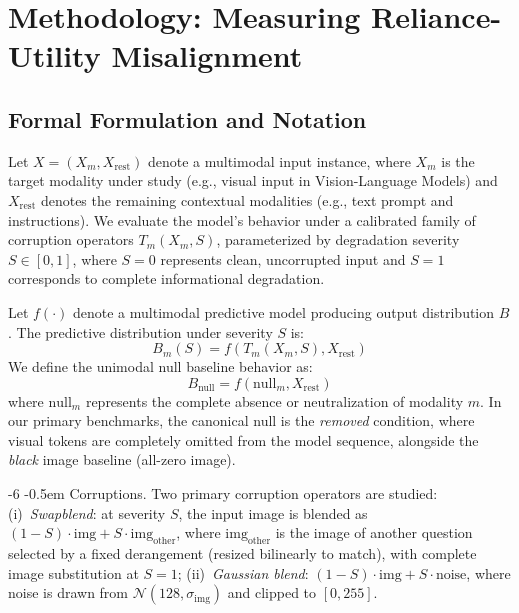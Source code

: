 \documentclass[graybox]{svmult}
\makeatletter
\renewcommand\paragraph{\@startsection{paragraph}{4}{\z@}%
  {-6\p@ \@plus -2\p@ \@minus -2\p@}%
  {-0.5em}%
  {\normalfont\normalsize\bfseries}}
\makeatother
\begin{document}
\section{Methodology: Measuring Reliance-Utility Misalignment}
\label{sec:method}

\subsection{Formal Formulation and Notation}
Let $X = (X_m, X_{\text{rest}})$ denote a multimodal input instance, where $X_m$ is the target modality under study (e.g., visual input in Vision-Language Models) and $X_{\text{rest}}$ denotes the remaining contextual modalities (e.g., text prompt and instructions). We evaluate the model's behavior under a calibrated family of corruption operators $T_m(X_m, S)$, parameterized by degradation severity $S \in [0, 1]$, where $S=0$ represents clean, uncorrupted input and $S=1$ corresponds to complete informational degradation.

Let $f(\cdot)$ denote a multimodal predictive model producing output distribution $B$. The predictive distribution under severity $S$ is:
\begin{equation}
B_m(S) = f(T_m(X_m, S), X_{\text{rest}})
\end{equation}
We define the unimodal null baseline behavior as:
\begin{equation}
B_{\text{null}} = f(\text{null}_m, X_{\text{rest}})
\end{equation}
where $\text{null}_m$ represents the complete absence or neutralization of modality $m$. In our primary benchmarks, the canonical null is the \emph{removed} condition, where visual tokens are completely omitted from the model sequence, alongside the \emph{black} image baseline (all-zero image).

\paragraph{Corruptions.}
Two primary corruption operators are studied: (i)~\emph{Swapblend}: at severity $S$, the input image is blended as $(1-S)\cdot\text{img} + S\cdot\text{img}_{\text{other}}$, where $\text{img}_{\text{other}}$ is the image of another question selected by a fixed derangement (resized bilinearly to match), with complete image substitution at $S=1$; (ii)~\emph{Gaussian blend}: $(1-S)\cdot\text{img} + S\cdot\text{noise}$, where noise is drawn from $\mathcal{N}(128, \sigma_{\text{img}})$ and clipped to $[0, 255]$.
\end{document}
